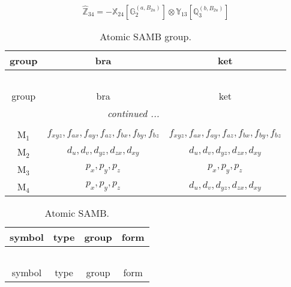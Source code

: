 \documentclass[fleqn,10pt,landscape]{article}
\begin{document}
\begin{itemize}
\begin{dmath*}
\hat{\mathbb{Z}}_{34}=- \mathbb{X}_{24}[\mathbb{G}_{2}^{(a,B_{2u})}] \otimes\mathbb{Y}_{13}[\mathbb{Q}_{3}^{(b,B_{2u})}]
\end{dmath*}
\begin{center}
\renewcommand{\arraystretch}{1.3}
\begin{longtable}{c|c|c}
\caption{Atomic SAMB group.}
 \\
 \hline \hline
group & bra & ket \\ \hline \endfirsthead

\multicolumn{2}{l}{\tablename\ \thetable{}} \\
 \hline \hline
group & bra & ket \\ \hline \endhead

 \hline \hline
\multicolumn{2}{r}{\footnotesize\it continued ...} \\ \endfoot

 \hline \hline
\multicolumn{2}{r}{} \\ \endlastfoot

M$_{1}$ & $f_{xyz}, f_{ax}, f_{ay}, f_{az}, f_{bx}, f_{by}, f_{bz}$ & $f_{xyz}, f_{ax}, f_{ay}, f_{az}, f_{bx}, f_{by}, f_{bz}$ \\
M$_{2}$ & $d_{u}, d_{v}, d_{yz}, d_{zx}, d_{xy}$ & $d_{u}, d_{v}, d_{yz}, d_{zx}, d_{xy}$ \\
M$_{3}$ & $p_{x}, p_{y}, p_{z}$ & $p_{x}, p_{y}, p_{z}$ \\
M$_{4}$ & $p_{x}, p_{y}, p_{z}$ & $d_{u}, d_{v}, d_{yz}, d_{zx}, d_{xy}$ \\
\end{longtable}
\end{center}
\begin{center}
\renewcommand{\arraystretch}{1.3}
\begin{longtable}{c|c|c|c}
\caption{Atomic SAMB.}
 \\
 \hline \hline
symbol & type & group & form \\ \hline \endfirsthead

\multicolumn{3}{l}{\tablename\ \thetable{}} \\
 \hline \hline
symbol & type & group & form \\ \hline \endhead


\end{longtable}
\end{center}
\end{itemize}
\end{document}
